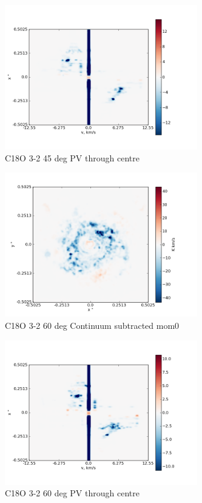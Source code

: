 \documentclass[useAMS,usenatbib]{mn2e}
\begin{document}
%

\begin{figure}
 \includegraphics[width=84mm]{Figures/sim/imageC18O_3-2_45deg_PV_centre.png}

 \caption{C18O 3-2 45 deg PV through centre}
\end{figure}


\begin{figure}
 \includegraphics[width=84mm]{Figures/sim/imageC18O_3-2_60deg_contSub.png}

 \caption{C18O 3-2 60 deg Continuum subtracted mom0}
\end{figure}

%

\begin{figure}
 \includegraphics[width=84mm]{Figures/sim/imageC18O_3-2_60deg_PV_centre.png}

 \caption{C18O 3-2 60 deg PV through centre}
\end{figure}
\end{document}
